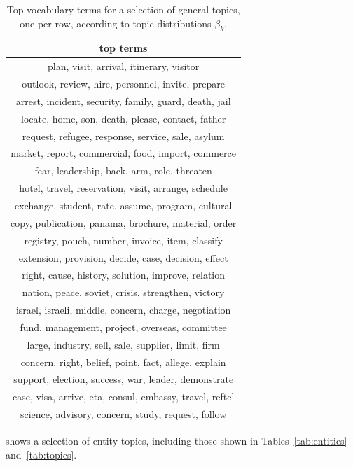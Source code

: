 \begin{table}
\centering
\small
\begin{tabular}{c}
\toprule
top terms \\
\midrule
plan, visit, arrival, itinerary, visitor \\
outlook, review, hire, personnel, invite, prepare \\
arrest, incident, security, family, guard, death, jail \\
locate, home, son, death, please, contact, father \\
request, refugee, response, service, sale, asylum \\
market, report, commercial, food, import, commerce \\
fear, leadership, back, arm, role, threaten \\
hotel, travel, reservation, visit, arrange, schedule \\
exchange, student, rate, assume, program, cultural \\
copy, publication, panama, brochure, material, order \\
registry, pouch, number, invoice, item, classify \\
extension, provision, decide, case, decision, effect \\
right, cause, history, solution, improve, relation \\
nation, peace, soviet, crisis, strengthen, victory \\
israel, israeli, middle, concern, charge, negotiation \\
fund, management, project, overseas, committee \\
large, industry, sell, sale, supplier, limit, firm \\
concern, right, belief, point, fact, allege, explain \\
support, election, success, war, leader, demonstrate \\
case, visa, arrive, eta, consul, embassy, travel, reftel \\
science, advisory, concern, study, request, follow \\
\bottomrule
\end{tabular}
\label{tab:generaltopics}
\caption{Top vocabulary terms for a selection of general topics, one per row, according to topic distributions $\beta_k$.}
\end{table}

 shows a selection of entity topics, including those shown in Tables~\ref{tab:entities} and~\ref{tab:topics}.


